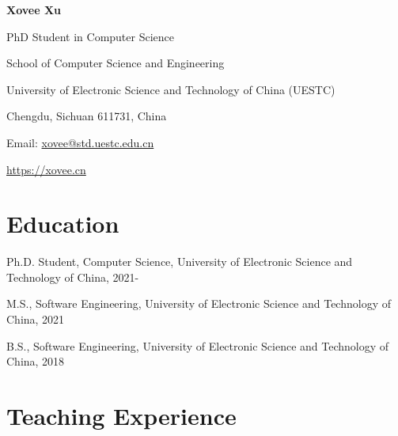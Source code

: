 \documentclass{article}
\begin{document}
\begin{center}
    \Huge{
    \textbf{Xovee Xu}}
\end{center}
\vspace{10pt}



\setlength{\parskip}{1pt}

\noindent PhD Student in Computer Science

\noindent School of Computer Science and Engineering

\noindent University of Electronic Science and Technology of China (UESTC)

\noindent Chengdu, Sichuan 611731, China

\noindent Email: \href{mailto:xovee@std.uestc.edu.cn}{xovee@std.uestc.edu.cn}

\noindent \url{https://xovee.cn}

\setlength{\parskip}{3pt}

\vspace{-8pt}
\section*{Education}
\vspace{-4pt}
\indent 

Ph.D. Student, Computer Science, University of Electronic Science and Technology of China, 2021-

M.S., Software Engineering, University of Electronic Science and Technology of China, 2021

B.S., Software Engineering, University of Electronic Science and Technology of China, 2018








\vspace{-8pt}
\section*{Teaching Experience}
\vspace{-4pt}
\indent
\end{document}
